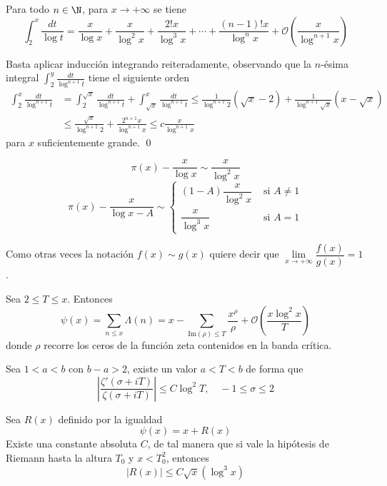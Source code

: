 \documentclass[TAN.tex]{subfiles}
\begin{document}
\begin{prop}
Para todo $n \in \N$, para $x \to +∞$ se tiene
\[ \int_2^x \frac{dt}{\log t} = \frac{x}{\log x} + \frac{x}{\log^2 x} + \frac{2!x}{\log^3 x} + \cdots + \frac{(n-1)!x}{\log^n x} + \mathcal{O}\left(\frac{x}{\log^{n+1}x}\right) \]
\end{prop}
\begin{dem}
Basta aplicar inducción integrando reiteradamente, observando que la $n$-ésima integral $\int_2^y \frac{dt}{\log^{n+1} t}$ tiene el siguiente orden
\begin{align*}
\int_2^x \frac{dt}{\log^{n+1} t} & = \int_2^{\sqrt{x}} \frac{dt}{\log^{n+1} t} + \int_{\sqrt{x}}^x \frac{dt}{\log^{n+1} t} ≤ \frac{1}{\log^{n+1}2}(\sqrt{x}-2)+\frac{1}{\log^{n+1}\sqrt{x}}(x-\sqrt{x})\\
 & ≤ \frac{\sqrt{x}}{\log^{n+1}2}+\frac{2^{n+1}x}{\log^{n+1}x} ≤ c \frac{x}{\log^{n+1}x}
\end{align*}
para $x$ suficientemente grande.
\qed
\end{dem}

\begin{coro}
\[ π(x) - \frac{x}{\log x} \sim \frac{x}{\log^2 x} \]
\[ π(x) - \frac{x}{\log x - A} \sim \begin{cases}
	(1-A)\dfrac{x}{\log^2 x} &\text{ si }A \neq 1\\
	\dfrac{x}{\log^3 x} &\text{ si }A=1
\end{cases}\]
\end{coro}

Como otras veces la notación $f(x) \sim g(x)$ quiere decir que $\lim\limits_{x \to +∞} \dfrac{f(x)}{g(x)} = 1$.

\begin{teorema}
Sea $2 ≤ T ≤ x$. Entonces
\[ ψ(x) = \sum_{n≤x} Λ(n) = x - \sum_{\text{Im}(ρ)≤T} \frac{x^ρ}{ρ} + \mathcal{O}\left(\frac{x\log^2 x}{T}\right) \]
donde $ρ$ recorre los ceros de la función zeta contenidos en la banda crítica.
\end{teorema}

\begin{lemma}
Sea $1<a<b$ con $b-a>2$, existe un valor $a<T<b$ de forma que
\[ \left|\frac{ζ'(σ+iT)}{ζ(σ+iT)}\right| ≤ C \log^2 T, \quad -1≤σ≤2 \]
\end{lemma}

\begin{teorema}
Sea $R(x)$ definido por la igualdad
\[ ψ(x) = x + R(x) \]
Existe una constante absoluta $C$, de tal manera que si vale la hipótesis de Riemann hasta la altura $T_0$ y $x < T_0^2$, entonces
\[ |R(x)| ≤ C \sqrt{x} (\log^3 x) \]
\end{teorema}
\end{document}
